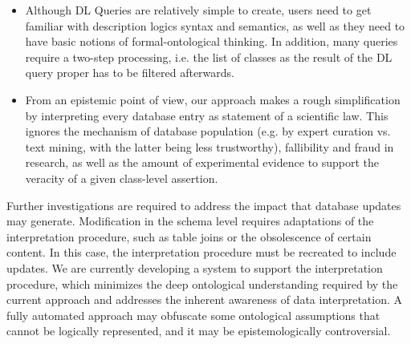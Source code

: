 \begin{itemize}
	\item Although DL Queries are relatively simple to create, users need to get familiar with description logics syntax and semantics, as well as they need to have basic notions of formal-ontological thinking. In addition, many queries require a two-step processing, i.e. the list of classes as the result of the DL query proper has to be filtered afterwards.
	\item From an epistemic point of view, our approach makes a rough simplification by interpreting every database entry as statement of a scientific law. This ignores the mechanism of database population (e.g. by expert curation vs. text mining, with the latter being less trustworthy), fallibility and fraud in research, as well as the amount of experimental evidence to support the veracity of a given class-level assertion.
\end{itemize}

Further investigations are required to address the impact that database updates may generate. Modification in the schema level requires adaptations of the interpretation procedure, such as table joins or the obsolescence of certain content. In this case, the interpretation procedure must be recreated to include updates. We are currently developing a system to support the interpretation procedure, which minimizes the deep ontological understanding required by the current approach and addresses the inherent awareness of data interpretation. A fully automated approach may obfuscate some ontological assumptions that cannot be logically represented, and it may be epistemologically controversial.
